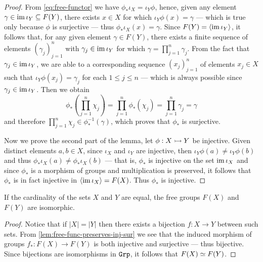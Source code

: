 \begin{proof}
    From \cref{eq:free-functor} we have \(\phi_{*} \iota_{X} = \iota_{Y} \phi\),
    hence, given any element \(\gamma \in \operatorname{im} \iota_{Y} \subseteq F(Y)\), there
    exists \(x \in X\) for which \(\iota_{Y} \phi(x) = \gamma\) --- which is true
    only because \(\phi\) is surjective --- thus \(\phi_{*} \iota_X(x) = \gamma\).
    Since \(F(Y) = \langle \operatorname{im} \iota_Y \rangle\), it follows that, for any given
    element \(\gamma \in F(Y)\), there exists a finite sequence of elements
    \((\gamma_j)_{j=1}^n\) with \(\gamma_j \in \operatorname{im} \iota_Y\) for which \(\gamma =
    \prod_{j=1}^n \gamma_j\). From the fact that \(\gamma_{j} \in \operatorname{im} \iota_Y\), we
    are able to a corresponding sequence \((x_j)_{j=1}^n\) of elements \(x_j \in X\)
    such that \(\iota_{Y} \phi(x_j) = \gamma_j\) for each \(1 \leq j \leq n\) ---
    which is always possible since \(\gamma_j \in \operatorname{im} \iota_Y\). Then we obtain
    \[
        \phi_{*}\left( \prod_{j=1}^n \chi_j \right) = \prod_{j=1}^n \phi_{*}(\chi_j)
        = \prod_{j=1}^n \gamma_j = \gamma
    \]
    and therefore \(\prod_{j=1}^n \chi_j \in \phi_{*}^{-1}(\gamma)\), which proves
    that \(\phi_{*}\) is surjective.

    Now we prove the second part of the lemma, let \(\phi: X \rightarrowtail Y\) be
    injective. Given distinct elements \(a, b \in X\), since \(\iota_X\) and
    \(\iota_Y\) are injective, then \(\iota_{Y} \phi(a) \neq \iota_Y \phi(b)\) and
    thus \(\phi_{*}\iota_X(a) \neq \phi_{*}\iota_X(b)\) --- that is, \(\phi_{*}\) is
    injective on the set \(\operatorname{im} \iota_X\) and since \(\phi_{*}\) is a morphism of
    groups and multiplication is preserved, it follows that \(\phi_{*}\) is in fact
    injective in \(\langle \operatorname{im} \iota_X \rangle = F(X)\). Thus \(\phi_{*}\) is
    injective.
\end{proof}

\begin{proposition}\label{prop:iso-free-grp}
    If the cardinality of the sets \(X\) and \(Y\) are equal, the free groups
    \(F(X)\) and \(F(Y)\) are isomorphic.
\end{proposition}

\begin{proof}
    Notice that if \(|X| = |Y|\) then there exists a bijection \(f: X \to Y\)
    between such sets. From \cref{lem:free-func-preserves-inj-sur} we see that the
    induced morphism of groups \(f_{*}: F(X) \to F(Y)\) is both injective and
    surjective --- thus bijective. Since bijections are isomorphisms in \({\texttt{Grp}}\), it
    follows that \(F(X) \simeq F(Y)\).
\end{proof}


